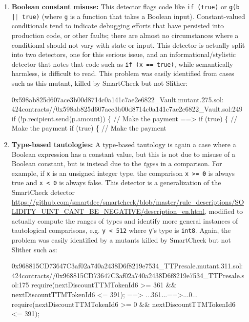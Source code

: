 \begin{enumerate}
\item {\bf Boolean constant misuse:}  This detector flags code like {\tt if (true)} or {\tt g(b || true)} (where {\tt g} is a function that takes a Boolean input).  Constant-valued conditionals tend to indicate debugging efforts that have persisted into production code, or other faults; there are almost no circumstances where a conditional should not vary with state or input.  This detector is actually split into two detectors, one for this serious issue, and an informational/stylistic detector that notes that code such as {\tt if (x == true)}, while semantically harmless, is difficult to read.  This problem was easily identified from cases such as this mutant, killed by SmartCheck but not Slither:

\begin{code}
0x598ab825d607ace3b00d8714c0a141c7ae2e6822\_Vault.mutant.275.sol: 424contracts//0x598ab825d607ace3b00d8714c0a141c7ae2e6822\_Vault.sol:249
        if (!p.recipient.send(p.amount)) \{  // Make the payment
 ==>          if (true) \{  // Make the payment
        if (true) \{  // Make the payment
\end{code}

\item {\bf Type-based tautologies:}  A type-based tautology is again a case where a Boolean expression has a constant value, but this is not due to misuse of a Boolean constant, but is instead due to the \emph{types} in a comparison.  For example, if {\tt x} is an unsigned integer type, the comparison {\tt x >= 0} is always true and {\tt x < 0} is always false.  This detector is a generalization of the SmartCheck detector \url{https://github.com/smartdec/smartcheck/blob/master/rule_descriptions/SOLIDITY_UINT_CANT_BE_NEGATIVE/description_en.html}, modified to actually compute the ranges of types and identify more general instances of tautological comparisons, e.g. {\tt y < 512} where {\tt y}'s type is {\tt int8}.  Again, the problem was easily identified by a mutants killed by SmartCheck but not Slither such as:

\begin{code}
0x968815CD73647C3af02a740a2438D6f8219e7534\_TTPresale.mutant.311.sol: 424contracts//0x968815CD73647C3af02a740a2438D6f8219e7534\_TTPresale.sol:175
        require(nextDiscountTTMTokenId6 >= 361 \&\& nextDiscountTTMTokenId6 <= 391);
 ==>  ...361...==>...0...
        require(nextDiscountTTMTokenId6 >= 0 \&\& nextDiscountTTMTokenId6 <= 391);
\end{code}


\end{enumerate}
